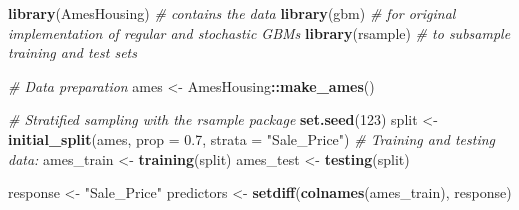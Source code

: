 \documentclass[
  10pt,
  ignorenonframetext,
]{beamer}
\newenvironment{Shaded}{\begin{snugshade}}{\end{snugshade}}
\newcommand{\AttributeTok}[1]{\textcolor[rgb]{0.13,0.29,0.53}{#1}}
\newcommand{\CommentTok}[1]{\textcolor[rgb]{0.56,0.35,0.01}{\textit{#1}}}
\newcommand{\DecValTok}[1]{\textcolor[rgb]{0.00,0.00,0.81}{#1}}
\newcommand{\FloatTok}[1]{\textcolor[rgb]{0.00,0.00,0.81}{#1}}
\newcommand{\FunctionTok}[1]{\textcolor[rgb]{0.13,0.29,0.53}{\textbf{#1}}}
\newcommand{\NormalTok}[1]{#1}
\newcommand{\OtherTok}[1]{\textcolor[rgb]{0.56,0.35,0.01}{#1}}
\newcommand{\SpecialCharTok}[1]{\textcolor[rgb]{0.81,0.36,0.00}{\textbf{#1}}}
\newcommand{\StringTok}[1]{\textcolor[rgb]{0.31,0.60,0.02}{#1}}
\begin{document}
\begin{frame}[fragile]
\scriptsize

\begin{Shaded}
\begin{Highlighting}[]
\FunctionTok{library}\NormalTok{(AmesHousing) }\CommentTok{\# contains the data}
\FunctionTok{library}\NormalTok{(gbm) }\CommentTok{\# for original implementation of regular and stochastic GBMs}
\FunctionTok{library}\NormalTok{(rsample) }\CommentTok{\# to subsample training and test sets}

\CommentTok{\# Data preparation}
\NormalTok{ames }\OtherTok{\textless{}{-}}\NormalTok{ AmesHousing}\SpecialCharTok{::}\FunctionTok{make\_ames}\NormalTok{()}

\CommentTok{\# Stratified sampling with the rsample package}
\FunctionTok{set.seed}\NormalTok{(}\DecValTok{123}\NormalTok{)}
\NormalTok{split }\OtherTok{\textless{}{-}} \FunctionTok{initial\_split}\NormalTok{(ames, }\AttributeTok{prop =} \FloatTok{0.7}\NormalTok{, }
                       \AttributeTok{strata =} \StringTok{"Sale\_Price"}\NormalTok{)}
\CommentTok{\# Training and testing data:}
\NormalTok{ames\_train  }\OtherTok{\textless{}{-}} \FunctionTok{training}\NormalTok{(split)}
\NormalTok{ames\_test   }\OtherTok{\textless{}{-}} \FunctionTok{testing}\NormalTok{(split)}

\NormalTok{response }\OtherTok{\textless{}{-}} \StringTok{"Sale\_Price"}
\NormalTok{predictors }\OtherTok{\textless{}{-}} \FunctionTok{setdiff}\NormalTok{(}\FunctionTok{colnames}\NormalTok{(ames\_train), response)}
\end{Highlighting}
\end{Shaded}
\end{frame}
\end{document}
